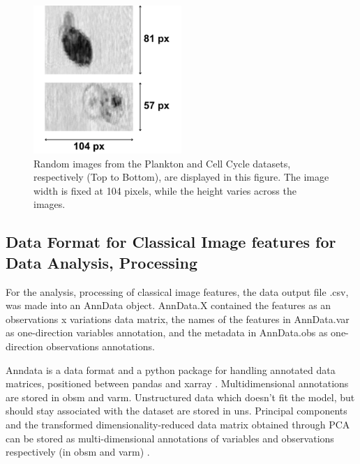 \documentclass[12pt,a4paper]{article}
\begin{document}
\begin{figure}
  \centering
  \includegraphics[width=0.5\textwidth]{Figures/sample_img_phytoplankton_cellcycle.png}
  \caption{Random images from the Plankton and Cell Cycle datasets, respectively (Top to Bottom), are displayed in this figure. The image width is fixed at 104 pixels, while the height varies across the images.}
  \label{sampleimgs}
\end{figure}

\subsection{Data Format for Classical Image features for Data Analysis, Processing}
\label{adata_scanpy}
For the analysis, processing of classical image features, the data output file .csv, was made into an AnnData object. AnnData.X contained the features as an observations x variations data matrix, the names of the features in AnnData.var as one-direction variables annotation, and the metadata in AnnData.obs as one-direction observations annotations.

Anndata is a data format and a python package for handling annotated data matrices, positioned between pandas and xarray \cite{virshup_rybakov_theis_angerer_wolf_2021}. Multidimensional annotations are stored in obsm and varm. Unstructured data which doesn’t fit the model, but should stay associated with the dataset are stored in uns. Principal components and the transformed dimensionality-reduced data matrix obtained through PCA can be stored as multi-dimensional annotations of variables and observations respectively (in obsm and varm) \cite{virshup_rybakov_theis_angerer_wolf_2021}.
\end{document}

